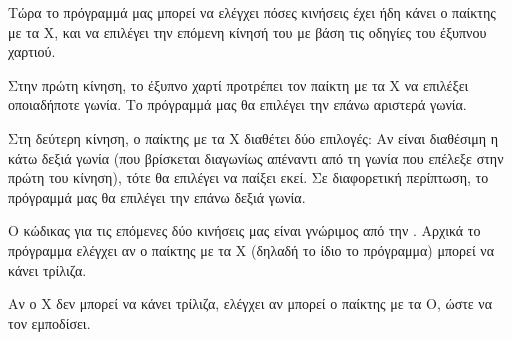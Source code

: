 \documentclass[a4paper,11pt,oneside]{book}
\begin{document}

Τώρα το πρόγραμμά μας μπορεί να ελέγχει πόσες κινήσεις έχει ήδη κάνει ο παίκτης με τα Χ, και να επιλέγει την επόμενη κίνησή του με βάση τις οδηγίες του έξυπνου χαρτιού. 

Στην πρώτη κίνηση, το έξυπνο χαρτί προτρέπει τον παίκτη με τα Χ να επιλέξει οποιαδήποτε γωνία. Το πρόγραμμά μας θα επιλέγει την επάνω αριστερά γωνία.



Στη δεύτερη κίνηση, ο παίκτης με τα Χ διαθέτει δύο επιλογές: Αν είναι διαθέσιμη η κάτω δεξιά γωνία (που βρίσκεται διαγωνίως απέναντι από τη γωνία που επέλεξε στην πρώτη του κίνηση), τότε θα επιλέγει να παίξει εκεί. Σε διαφορετική περίπτωση, το πρόγραμμά μας θα επιλέγει την επάνω δεξιά γωνία.


Ο κώδικας για τις επόμενες δύο κινήσεις μας είναι γνώριμος από την . Αρχικά το πρόγραμμα ελέγχει αν ο παίκτης με τα Χ (δηλαδή το ίδιο το πρόγραμμα) μπορεί να κάνει τρίλιζα. 


Αν ο Χ δεν μπορεί να κάνει τρίλιζα, ελέγχει αν μπορεί ο παίκτης με τα Ο, ώστε να τον εμποδίσει. 

\end{document}
